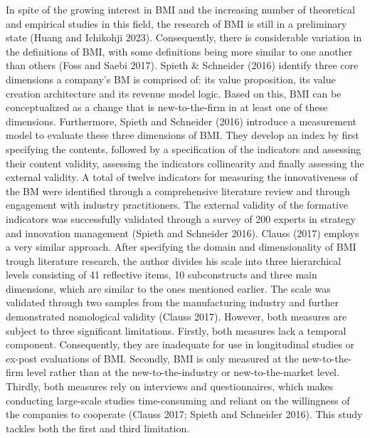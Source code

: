 \documentclass[
]{article}
\begin{document}
In spite of the growing interest in BMI and the increasing number of
theoretical and empirical studies in this field, the research of BMI is
still in a preliminary state (Huang and Ichikohji 2023). Consequently,
there is considerable variation in the definitions of BMI, with some
definitions being more similar to one another than others (Foss and
Saebi 2017). Spieth \& Schneider (2016) identify three core dimensions a
company's BM is comprised of: its value proposition, its value creation
architecture and its revenue model logic. Based on this, BMI can be
conceptualized as a change that is new-to-the-firm in at least one of
these dimensions. Furthermore, Spieth and Schneider (2016) introduce a
measurement model to evaluate these three dimensions of BMI. They
develop an index by first specifying the contents, followed by a
specification of the indicators and assessing their content validity,
assessing the indicators collinearity and finally assessing the external
validity. A total of twelve indicators for measuring the innovativeness
of the BM were identified through a comprehensive literature review and
through engagement with industry practitioners. The external validity of
the formative indicators was successfully validated through a survey of
200 experts in strategy and innovation management (Spieth and Schneider
2016). Clauss (2017) employs a very similar approach. After specifying
the domain and dimensionality of BMI trough literature research, the
author divides his scale into three hierarchical levels consisting of 41
reflective items, 10 subconstructs and three main dimensions, which are
similar to the ones mentioned earlier. The scale was validated through
two samples from the manufacturing industry and further demonstrated
nomological validity (Clauss 2017). However, both measures are subject
to three significant limitations. Firstly, both measures lack a temporal
component. Consequently, they are inadequate for use in longitudinal
studies or ex-post evaluations of BMI. Secondly, BMI is only measured at
the new-to-the-firm level rather than at the new-to-the-industry or
new-to-the-market level. Thirdly, both measures rely on interviews and
questionnaires, which makes conducting large-scale studies
time-consuming and reliant on the willingness of the companies to
cooperate (Clauss 2017; Spieth and Schneider 2016). This study tackles
both the first and third limitation.
\end{document}
